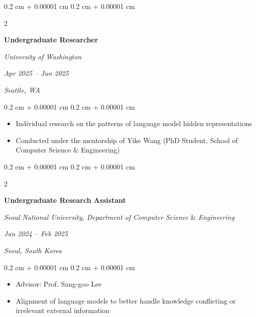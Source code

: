 \documentclass[10pt, letterpaper]{article}
\newenvironment{highlights}{
    \begin{itemize}[
        topsep=0.10 cm,
        parsep=0.10 cm,
        partopsep=0pt,
        itemsep=0pt,
        leftmargin=0.4 cm + 10pt
    ]
}{
    \end{itemize}
} %
\newenvironment{onecolentry}{
    \begin{adjustwidth}{
        0.2 cm + 0.00001 cm
    }{
        0.2 cm + 0.00001 cm
    }
}{
    \end{adjustwidth}
} %
\newenvironment{twocolentry}[2][]{
    \onecolentry
    \def\secondColumn{#2}
    \setcolumnwidth{\fill, 4.5 cm}
    \begin{paracol}{2}
}{
    \switchcolumn \raggedleft \secondColumn
    \end{paracol}
    \endonecolentry
} %
\begin{document}
        \vspace{0.3 cm}

        \begin{twocolentry}{
        \textit{Apr 2025 – Jun 2025}
        
        \textit{Seattle, WA}}
            \textbf{Undergraduate Researcher}

            \textit{University of Washington}
        \end{twocolentry}

        \vspace{0.10 cm}
        \begin{onecolentry}
            \begin{highlights}
                \item Individual research on the patterns of language model hidden representations
                \item Conducted under the mentorship of Yike Wang (PhD Student, School of Computer Science \& Engineering)
            \end{highlights}
        \end{onecolentry}

        \vspace{0.3 cm}

        \break

            \begin{twocolentry}{
            \textit{Jun 2024 – Feb 2025}
            
            \textit{Seoul, South Korea}}
                \textbf{Undergraduate Research Assistant}

                \textit{Seoul National University,  Department of Computer Science} \& \textit{Engineering}
            \end{twocolentry}

            \vspace{0.10 cm}
            \begin{onecolentry}
                \begin{highlights}
                    \item Advisor: Prof. Sang-goo Lee
                    \item Alignment of language models to better handle knowledge conflicting or irrelevant external information
                \end{highlights}
            \end{onecolentry}
\end{document}
